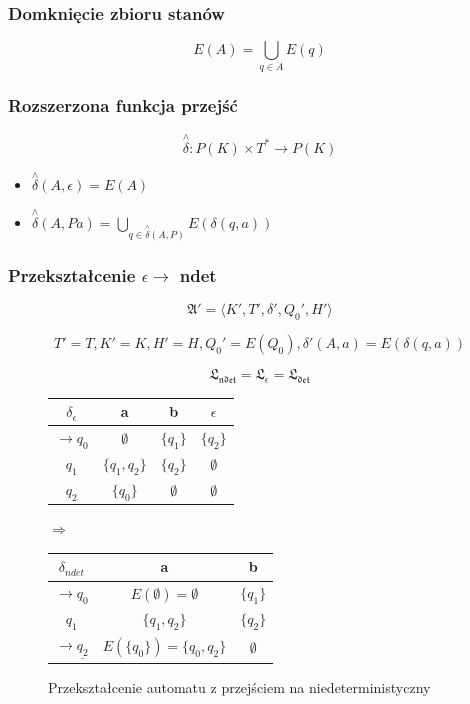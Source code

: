 \documentclass{../notatki}
\begin{document}
\subsubsection{Domknięcie zbioru stanów}

$$
E(A) = \bigcup_{q \in A}E(q)
$$

\subsubsection{Rozszerzona funkcja przejść}

$$
\stackrel{\wedge}{\delta}: P(K) \times T^* \rightarrow P(K)
$$

\begin{itemize}
  \item $\stackrel{\wedge}{\delta}(A, \epsilon) = E(A)$
  \item $\stackrel{\wedge}{\delta}(A, Pa) = \bigcup_{q \in
    \stackrel{\wedge}{\delta}(A, P)}E(\delta(q, a))$
\end{itemize}

\subsubsection{Przekształcenie \texorpdfstring{$\epsilon
\rightarrow$}{eps ->} ndet}

$$
\mathfrak{A}' = \langle K',T',\delta',Q_0',H' \rangle
$$

$$
T' = T, K' = K, H' = H, Q_0' = E(Q_0), \delta'(A, a) = E(\delta(q, a))
$$

$$
\mathfrak{L_{ndet} = \mathfrak{L_{\epsilon}} = \mathfrak{L_{det}}}
$$

\begin{figure}[H]
  \centering
  \begin{tabular}{c|c|c|c}
    $\delta_\epsilon$ & a              & b         & $\epsilon$ \\ \hline
    $\rightarrow q_0$ & $\emptyset$    & $\{q_1\}$ & $\{q_2\}$  \\
    $q_1$             & $\{q_1, q_2\}$ & $\{q_2\}$ & $\emptyset$ \\
    \underline{$q_2$} & $\{q_0\}$    & $\emptyset$ & $\emptyset$ \\
  \end{tabular}
  \textbf{$\Longrightarrow$}
  \begin{tabular}{c|c|c}
    $\delta_{ndet}$              & a                           & b
    \\ \hline
    $\rightarrow q_0$             & $E(\emptyset)=\emptyset$    & $\{q_1\}$   \\
    $q_1$                         & $\{q_1, q_2\}$              & $\{q_2\}$   \\
    $\rightarrow \underline{q_2}$ & $E(\{q_0\})=\{q_0, q_2\}$   & $\emptyset$ \\
  \end{tabular}
  \caption{Przekształcenie automatu z przejściem na niedeterministyczny}
  \label{fig:automat:eps2ndet}
\end{figure}
\end{document}
